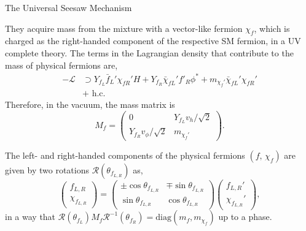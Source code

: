 \documentclass{../bredelebeamer}
\begin{document}
\begin{frame}{{The Universal Seesaw Mechanism}}
	
	They acquire mass from the mixture with a vector-like fermion $\chi_f$, which is charged as the right-handed component of the respective SM fermion, in a UV complete theory. 
	\vfill 
	The terms in the Lagrangian density that contribute to the mass of physical fermions are,
\begin{equation}
    \begin{aligned}
        -\mathcal{L}&\supset 
    Y_{f_L} \bar{f}_L' \chi_{fR}' H 
    +Y_{f_R} \bar\chi_{fL}' f'_R  \phi^* 
    + m_{\chi_f'} \bar{\chi}_{f L}' \chi_{f R}'\\
&+\text { h.c.}
    \end{aligned}
\end{equation}
Therefore, in the vacuum, the mass matrix is
\begin{equation}
    M_f=
    \begin{pmatrix}
    0 & Y_{f_L} v_h /\sqrt2\\
    Y_{f_R} v_\phi /\sqrt2 & m_{\chi_f'}    
    \end{pmatrix}.
\end{equation}

The left- and right-handed components of the physical fermions $(f,\,\chi_f)$ are given by two rotations $\mathcal R(\theta_{f_{L,R}})$ as, 
\begin{equation}
    \begin{pmatrix}
        f_{L,R}
        \\
        \chi_{f_{L,R}}
    \end{pmatrix}
    =
    \begin{pmatrix}
        \pm\cos\theta_{f_{L,R}} & \mp \sin \theta_{f_{L,R}}
        \\
        \sin \theta_{f_{L,R}} & \cos\theta_{f_{L,R}}
    \end{pmatrix}
    \begin{pmatrix}
        f_{L,R}'
        \\
        \chi_{f_{L,R}}'
    \end{pmatrix},
\end{equation}
in a way that $\mathcal{R}(\theta_{f_L})M_f\mathcal{R}^{-1}(\theta_{f_R})=\text{diag}(m_f,m_{\chi_f})$ up to a phase.

\end{frame}
\end{document}
